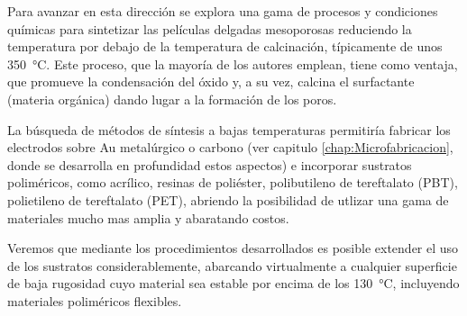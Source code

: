 	Para avanzar en esta dirección se explora una gama de procesos y condiciones químicas para sintetizar las películas delgadas mesoporosas reduciendo la temperatura por debajo de la temperatura de calcinación, típicamente de unos \SI{350}{\celsius}. Este proceso, que la mayoría de los autores emplean, tiene como ventaja, que promueve la condensación del óxido y, a su vez, calcina el surfactante (materia orgánica) dando lugar a la formación de los poros.\cite{Zhang2015,Horiuchi2011,Clark2000,Zhang2005}

	La búsqueda de métodos de síntesis a bajas temperaturas permitiría fabricar los electrodos sobre Au metalúrgico o carbono (ver capitulo \ref{chap:Microfabricacion}, donde se desarrolla en profundidad estos aspectos) e incorporar sustratos poliméricos, como acrílico, resinas de poliéster, polibutileno de tereftalato (PBT), polietileno de tereftalato (PET), abriendo la posibilidad de utlizar una gama de materiales mucho mas amplia y abaratando costos.

	Veremos que mediante los procedimientos desarrollados es posible extender el uso de los sustratos considerablemente, abarcando virtualmente a cualquier superficie de baja rugosidad cuyo material sea estable por encima de los \SI{130}{\celsius}, incluyendo materiales poliméricos flexibles.
		


